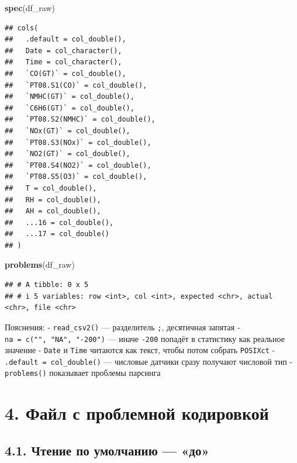 \documentclass[
]{article}
\newenvironment{Shaded}{\begin{snugshade}}{\end{snugshade}}
\newcommand{\FunctionTok}[1]{\textcolor[rgb]{0.13,0.29,0.53}{\textbf{#1}}}
\newcommand{\NormalTok}[1]{#1}
\begin{document}
\begin{Shaded}
\begin{Highlighting}[]
\FunctionTok{spec}\NormalTok{(df\_raw)}
\end{Highlighting}
\end{Shaded}

\begin{verbatim}
## cols(
##   .default = col_double(),
##   Date = col_character(),
##   Time = col_character(),
##   `CO(GT)` = col_double(),
##   `PT08.S1(CO)` = col_double(),
##   `NMHC(GT)` = col_double(),
##   `C6H6(GT)` = col_double(),
##   `PT08.S2(NMHC)` = col_double(),
##   `NOx(GT)` = col_double(),
##   `PT08.S3(NOx)` = col_double(),
##   `NO2(GT)` = col_double(),
##   `PT08.S4(NO2)` = col_double(),
##   `PT08.S5(O3)` = col_double(),
##   T = col_double(),
##   RH = col_double(),
##   AH = col_double(),
##   ...16 = col_double(),
##   ...17 = col_double()
## )
\end{verbatim}

\begin{Shaded}
\begin{Highlighting}[]
\FunctionTok{problems}\NormalTok{(df\_raw)}
\end{Highlighting}
\end{Shaded}

\begin{verbatim}
## # A tibble: 0 x 5
## # i 5 variables: row <int>, col <int>, expected <chr>, actual <chr>, file <chr>
\end{verbatim}

Пояснения: - \texttt{read\_csv2()} --- разделитель \texttt{;},
десятичная запятая - \texttt{na\ =\ c("",\ "NA",\ "-200")} --- иначе
\texttt{-200} попадёт в статистику как реальное значение - \texttt{Date}
и \texttt{Time} читаются как текст, чтобы потом собрать \texttt{POSIXct}
- \texttt{.default\ =\ col\_double()} --- числовые датчики сразу
получают числовой тип - \texttt{problems()} показывает проблемы парсинга

\section{4. Файл с проблемной
кодировкой}\label{ux444ux430ux439ux43b-ux441-ux43fux440ux43eux431ux43bux435ux43cux43dux43eux439-ux43aux43eux434ux438ux440ux43eux432ux43aux43eux439}

\subsection{4.1. Чтение по умолчанию ---
«до»}\label{ux447ux442ux435ux43dux438ux435-ux43fux43e-ux443ux43cux43eux43bux447ux430ux43dux438ux44e-ux434ux43e}
\end{document}
